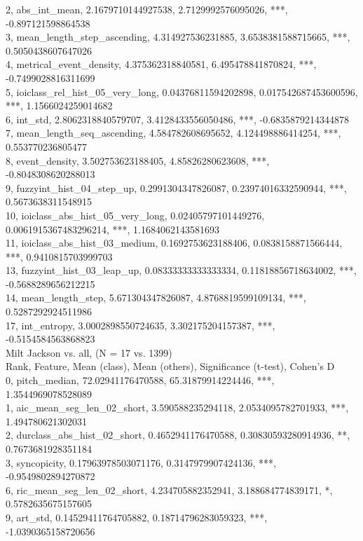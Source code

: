 2, abs_int_mean, 2.1679710144927538, 2.7129992576095026, ***, -0.897121598864538\\
3, mean_length_step_ascending, 4.314927536231885, 3.6538381588715665, ***, 0.5050438607647026\\
4, metrical_event_density, 4.375362318840581, 6.495478841870824, ***, -0.7499028816311699\\
5, ioiclass_rel_hist_05_very_long, 0.04376811594202898, 0.017542687453600596, ***, 1.1566024259014682\\
6, int_std, 2.8062318840579707, 3.4128433556050486, ***, -0.6835879214344878\\
7, mean_length_seq_ascending, 4.584782608695652, 4.124498886414254, ***, 0.553770236805477\\
8, event_density, 3.502753623188405, 4.85826280623608, ***, -0.8048308620288013\\
9, fuzzyint_hist_04_step_up, 0.2991304347826087, 0.23974016332590944, ***, 0.5673638311548915\\
10, ioiclass_abs_hist_05_very_long, 0.02405797101449276, 0.0061915367483296214, ***, 1.1684062143581693\\
11, ioiclass_abs_hist_03_medium, 0.1692753623188406, 0.0838158871566444, ***, 0.9410815703999703\\
13, fuzzyint_hist_03_leap_up, 0.08333333333333334, 0.11818856718634002, ***, -0.5688289656212215\\
14, mean_length_step, 5.671304347826087, 4.8768819599109134, ***, 0.5287292924511986\\
17, int_entropy, 3.0002898550724635, 3.302175204157387, ***, -0.5154584563868823\\
Milt Jackson vs. all, (N = 17 vs. 1399)\\
Rank, Feature, Mean (class), Mean (others), Significance (t-test), Cohen's D\\
0, pitch_median, 72.02941176470588, 65.31879914224446, ***, 1.3544969078528089\\
1, aic_mean_seg_len_02_short, 3.590588235294118, 2.0534095782701933, ***, 1.494780621302031\\
2, durclass_abs_hist_02_short, 0.4652941176470588, 0.30830593280914936, **, 0.7673681928351184\\
3, syncopicity, 0.17963978503071176, 0.3147979907424136, ***, -0.9549802894270872\\
6, ric_mean_seg_len_02_short, 4.234705882352941, 3.188684774839171, *, 0.5782635675157605\\
9, art_std, 0.14529411764705882, 0.18714796283059323, ***, -1.0390365158720656\\

